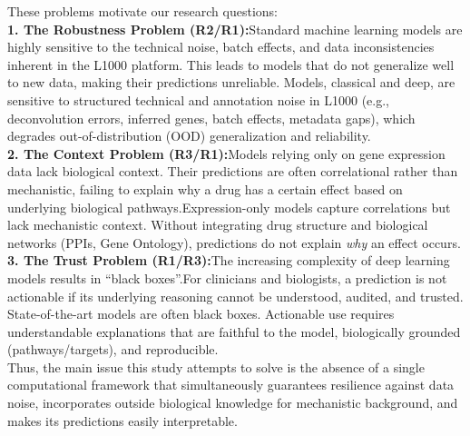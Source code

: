 \documentclass[12pt,a4paper]{article}
\begin{document}
\noindent
These problems motivate our research questions:
\\

\textbf{1. The Robustness Problem (R2/R1):}Standard machine learning models are highly sensitive to the technical noise, batch effects, and data inconsistencies inherent in the L1000 platform. This leads to models that do not generalize well to new data, making their predictions unreliable. Models, classical and deep, are sensitive to structured technical and annotation noise in L1000 (e.g., deconvolution errors, inferred genes, batch effects, metadata gaps), which degrades out-of-distribution (OOD) generalization and reliability.
\\
\textbf{2. The Context Problem (R3/R1):}Models relying only on gene expression data lack biological context. Their predictions are often correlational rather than mechanistic, failing to explain why a drug has a certain effect based on underlying biological pathways.Expression-only models capture correlations but lack mechanistic context. Without integrating drug structure and biological networks (PPIs, Gene Ontology), predictions do not explain \emph{why} an effect occurs.
\\
\textbf{3. The Trust Problem (R1/R3):}The increasing complexity of deep learning models results in \enquote{black boxes}.For clinicians and biologists, a prediction is not actionable if its underlying reasoning cannot be understood, audited, and trusted. State-of-the-art models are often black boxes. Actionable use requires understandable explanations that are faithful to the model, biologically grounded (pathways/targets), and reproducible.
\\
\noindent
Thus, the main issue this study attempts to solve is the absence of a single computational framework that simultaneously guarantees resilience against data noise, incorporates outside biological knowledge for mechanistic background, and makes its predictions easily interpretable.
\end{document}
